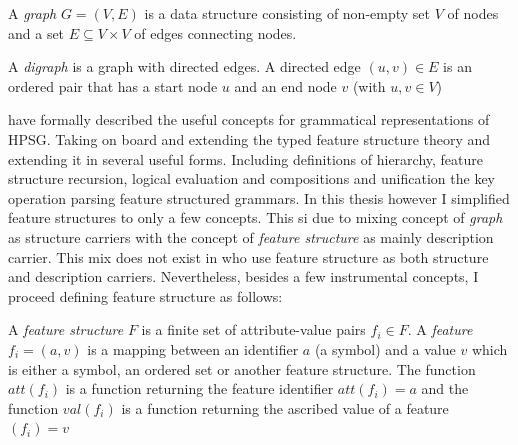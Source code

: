 \begin{definition}[Graph]\label{def:graph}
	A \textit{graph} $G=(V,E)$ is a data structure consisting of non-empty set $V$ of nodes and a set $E\subseteq V \times V$ of edges connecting nodes.
\end{definition}

\begin{definition}[Digraph]\label{def:digraph}
	A \textit{digraph} is a graph with directed edges. A directed edge $(u,v)\in E$ is an ordered pair that has a start node $u$ and an end node $v$ (with $u, v \in V$)
\end{definition}


\citet{Pollard1987} have formally described the useful concepts for grammatical representations of HPSG. Taking on board and extending the typed feature structure theory and extending it in several useful forms. Including definitions of hierarchy, feature structure recursion, logical evaluation and compositions and unification the key operation parsing feature structured grammars. In this thesis however I simplified feature structures to only a few concepts. This si due to mixing concept of \textit{graph} as structure carriers with the concept of \textit{feature structure} as mainly description carrier. This mix does not exist in \citep{Pollard1987} who use feature structure as both structure and description carriers. Nevertheless, besides a few instrumental concepts, I proceed defining feature structure as follows:

\begin{definition}\label{def:fs}
	A \textit{feature structure} $F$ is a finite set of attribute-value pairs $f_{i} \in F$. A \textit{feature} $f_{i}=(a,v)$ is a mapping between an identifier $a$ (a symbol) and a value $v$ which is either a symbol, an ordered set or another feature structure. The function $att(f_{i})$ is a function returning the feature identifier $att(f_{i})=a$ and the function $val(f_{i})$ is a function returning the ascribed value of a feature $(f_{i})=v$
\end{definition}

